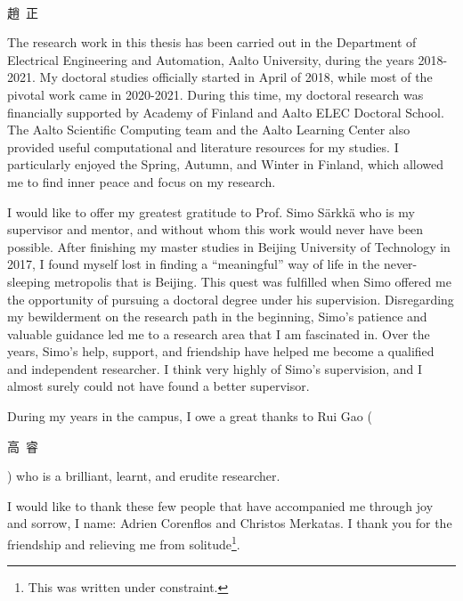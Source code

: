 \begin{preface}[Helsinki]{\large{\begin{CJK}{UTF8}{bkai}\\趙~正\end{CJK}}
}
The research work in this thesis has been carried out in the Department of Electrical Engineering and Automation, Aalto University, during the years 2018-2021. My doctoral studies officially started in April of 2018, while most of the pivotal work came in 2020-2021. During this time, my doctoral research was financially supported by Academy of Finland and Aalto ELEC Doctoral School. The Aalto Scientific Computing team and the Aalto Learning Center also provided useful computational and literature resources for my studies. I particularly enjoyed the Spring, Autumn, and Winter in Finland, which allowed me to find inner peace and focus on my research.

I would like to offer my greatest gratitude to Prof. Simo S\"{a}rkk\"{a} who is my supervisor and mentor, and without whom this work would never have been possible. After finishing my master studies in Beijing University of Technology in 2017, I found myself lost in finding a ``meaningful'' way of life in the never-sleeping metropolis that is Beijing. This quest was fulfilled when Simo offered me the opportunity of pursuing a doctoral degree under his supervision. Disregarding my bewilderment on the research path in the beginning, Simo's patience and valuable guidance led me to a research area that I am fascinated in. Over the years, Simo's help, support, and friendship have helped me become a qualified and independent researcher. I think very highly of Simo's supervision, and I almost surely could not have found a better supervisor. 

During my years in the campus, I owe a great thanks to Rui Gao (\begin{CJK}{UTF8}{bkai}高~睿\end{CJK}) who is a brilliant, learnt, and erudite researcher.

I would like to thank these few people that have accompanied me through joy and sorrow, I name: Adrien Corenflos and Christos Merkatas. I thank you for the friendship and relieving me from solitude\footnote{This was written under constraint.}.  


\end{preface}
